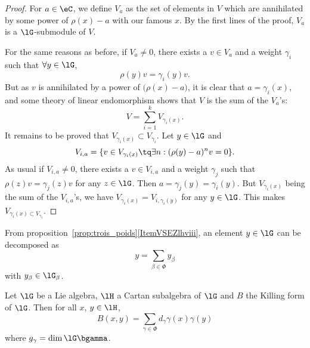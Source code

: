 \begin{proof}
For $a\in\eC$, we define $V_a$ as the set of elements in $V$ which are annihilated by some power of $\rho(x)-a$ with our famous $x$. By the first lines of the proof, $V_a$ is a $\lG$-submodule of $V$.

For the same reasons as before, if $V_a\neq 0$, there exists a $v\in V_a$ and a weight $\gamma_i$ such that $\forall y\in\lG$,
\[
\rho(y)v=\gamma_i(y)v.
\]
But as $v$ is annihilated by a power of $\big( \rho(x)-a \big)$, it is clear that $a=\gamma_i(x)$, and some theory of linear endomorphism shows that $V$ is the sum of the $V_a$'s:
\begin{equation}
V=\sum_{i=1}^kV_{\gamma_i(x)}.
\end{equation}
It remains to be proved that $V_{\gamma_i(x)}\subset V_{\gamma_i}$. Let $y\in\lG$ and
\[
V_{i,a}=\{ v\in V_{\gamma_i(x)}\tq\exists n: (\rho(y)-a)^nv=0 \}.
\]
As usual if $V_{i,a}\neq 0$, there exists a $v\in V_{i,a}$ and a weight $\gamma_j$ such that $\rho(z)v=\gamma_j(z)v$ for any $z\in\lG$. Then $a=\gamma_j(y)=\gamma_i(y)$. But $V_{\gamma_i(x)}$ being the sum of the $V_{i,a}$'s, we have $V_{\gamma_i(x)}=V_{i,\gamma_i(y)}$ for any $y\in\lG$. This makes $V_{\gamma_i(x)\subset V_{\gamma_i}}$.

\end{proof}

From proposition~\ref{prop:trois_poids}\ref{ItemVSEZlhviii}, an element $y\in\lG$ can be decomposed as
\begin{equation}\label{eq:decomp_racine}
    y=\sum_{\beta\in\Phi}y_{\beta}
\end{equation}
with $y_{\beta}\in\lG_{\beta}$.

\begin{theorem} \label{tho:Killing_Cartan}
    Let $\lG$ be a Lie algebra, $\lH$ a Cartan subalgebra of $\lG$ and $B$ the Killing form of $\lG$. Then for all $x$, $y\in\lH$,
    \begin{equation}
    B(x,y)=\sum_{\gamma\in\Phi}d_{\gamma}\gamma(x)\gamma(y)
    \end{equation}
    where $g_{\gamma}=\dim\lG\bgamma$.
\end{theorem}

